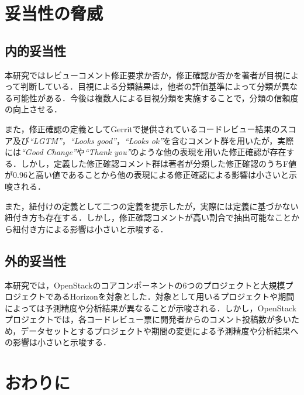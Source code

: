 \documentclass[submit,techrep,noauthor]{ipsj}
\begin{document}
\section{妥当性の脅威}\label{sec:discussion}
\subsection{内的妥当性}
本研究ではレビューコメント修正要求か否か，修正確認か否かを著者が目視によって判断している．目視による分類結果は，他者の評価基準によって分類が異なる可能性がある．今後は複数人による目視分類を実施することで，分類の信頼度の向上させる．

また，修正確認の定義としてGerritで提供されているコードレビュー結果のスコア及び\textit{``LGTM''}，\textit{``Looks good''}，\textit{``Looks ok''}を含むコメント群を用いたが，実際には\textit{``Good Change''}や\textit{``Thank you''}のような他の表現を用いた修正確認が存在する．しかし，定義した修正確認コメント群は著者が分類した修正確認のうちF値が0.96と高い値であることから他の表現による修正確認による影響は小さいと示唆される．

また，紐付けの定義として二つの定義を提示したが，実際には定義に基づかない紐付き方も存在する．しかし，修正確認コメントが高い割合で抽出可能なことから紐付き方による影響は小さいと示唆する．

\subsection{外的妥当性}
本研究では，OpenStackのコアコンポーネントの6つのプロジェクトと大規模プロジェクトであるHorizonを対象とした．対象として用いるプロジェクトや期間によっては予測精度や分析結果が異なることが示唆される．しかし，OpenStackプロジェクトでは，各コードレビュー票に開発者からのコメント投稿数が多いため，データセットとするプロジェクトや期間の変更による予測精度や分析結果への影響は小さいと示唆する．

\section{おわりに}\label{sec:conclusion}
\end{document}
